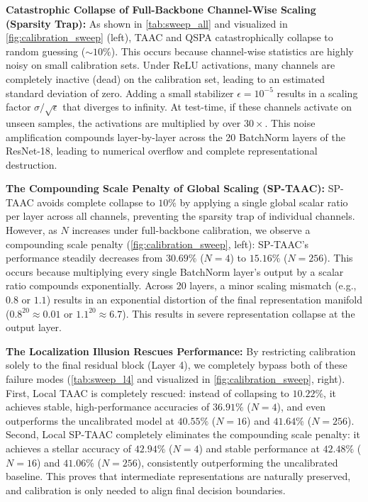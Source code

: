 \documentclass{article}
\begin{document}
\textbf{Catastrophic Collapse of Full-Backbone Channel-Wise Scaling (Sparsity Trap):} 
As shown in \cref{tab:sweep_all} and visualized in \cref{fig:calibration_sweep} (left), TAAC and QSPA catastrophically collapse to random guessing ($\sim 10\%$). This occurs because channel-wise statistics are highly noisy on small calibration sets. Under ReLU activations, many channels are completely inactive (dead) on the calibration set, leading to an estimated standard deviation of zero. Adding a small stabilizer $\epsilon = 10^{-5}$ results in a scaling factor $\sigma / \sqrt{\epsilon}$ that diverges to infinity. At test-time, if these channels activate on unseen samples, the activations are multiplied by over $30\times$. This noise amplification compounds layer-by-layer across the 20 BatchNorm layers of the ResNet-18, leading to numerical overflow and complete representational destruction.

\textbf{The Compounding Scale Penalty of Global Scaling (SP-TAAC):}
SP-TAAC avoids complete collapse to $10\%$ by applying a single global scalar ratio per layer across all channels, preventing the sparsity trap of individual channels. However, as $N$ increases under full-backbone calibration, we observe a compounding scale penalty (\cref{fig:calibration_sweep}, left): SP-TAAC's performance steadily decreases from $30.69\%$ ($N=4$) to $15.16\%$ ($N=256$). This occurs because multiplying every single BatchNorm layer's output by a scalar ratio compounds exponentially. Across 20 layers, a minor scaling mismatch (e.g., $0.8$ or $1.1$) results in an exponential distortion of the final representation manifold ($0.8^{20} \approx 0.01$ or $1.1^{20} \approx 6.7$). This results in severe representation collapse at the output layer.

\textbf{The Localization Illusion Rescues Performance:}
By restricting calibration solely to the final residual block (Layer 4), we completely bypass both of these failure modes (\cref{tab:sweep_l4} and visualized in \cref{fig:calibration_sweep}, right). 
First, Local TAAC is completely rescued: instead of collapsing to $10.22\%$, it achieves stable, high-performance accuracies of \textbf{$36.91\%$} ($N=4$), and even outperforms the uncalibrated model at \textbf{$40.55\%$} ($N=16$) and \textbf{$41.64\%$} ($N=256$).
Second, Local SP-TAAC completely eliminates the compounding scale penalty: it achieves a stellar accuracy of \textbf{$42.94\%$} ($N=4$) and stable performance at \textbf{$42.48\%$} ($N=16$) and \textbf{$41.06\%$} ($N=256$), consistently outperforming the uncalibrated baseline. This proves that intermediate representations are naturally preserved, and calibration is only needed to align final decision boundaries.
\end{document}
